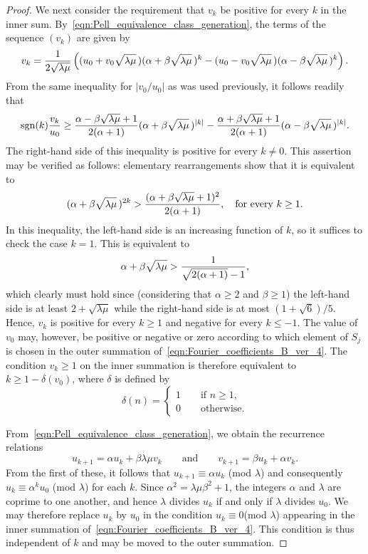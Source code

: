 \documentclass[11pt,reqno]{amsart}
\renewcommand{\=}{\;=\;}
\theoremstyle{myremark}
\newcommand{\sgn}{\operatorname{sgn}}
\begin{document}
\begin{proof}
We next consider the requirement that $v_k$ be positive for every $k$ in the inner sum. By~\eqref{eqn:Pell_equivalence_class_generation}, the terms of the sequence $(v_k)$ are given by 
\[ v_k = {1 \over 2\sqrt{\lambda\mu}} \left( (u_0 + v_0 \sqrt{\lambda\mu} \,)(\alpha + \beta \sqrt{\lambda\mu} \,)^k - (u_0 - v_0 \sqrt{\lambda\mu} \,)(\alpha - \beta \sqrt{\lambda\mu} \,)^k \right). \]
From the same inequality for $|v_0/u_0|$ as was used previously, it follows readily that
\[ 
\sgn(k) {v_k \over u_0} \geq {\alpha - \beta\sqrt{\lambda\mu} + 1 \over 2(\alpha+1)} (\alpha + \beta \sqrt{\lambda\mu} \,)^{|k|} - {\alpha + \beta\sqrt{\lambda\mu} + 1 \over 2(\alpha+1)} (\alpha - \beta \sqrt{\lambda\mu} \,)^{|k|}. 
\]
The right-hand side of this inequality is positive for every $k \neq 0$. This assertion may be verified as follows: elementary rearrangements show that it is equivalent to
\[ 
(\alpha+\beta\sqrt{\lambda\mu}\,)^{2k} > {(\alpha+\beta\sqrt{\lambda\mu}+1)^2 \over 2(\alpha+1)}, \quad \text{for every $k \geq 1$.} 
\]
In this inequality, the left-hand side is an increasing function of $k$, so it suffices to check the case $k=1$. 
This is equivalent to
\[ 
\alpha+\beta\sqrt{\lambda\mu} > {1 \over \sqrt{2(\alpha+1)}-1}, 
\]
which clearly must hold since (considering that $\alpha\geq2$ and $\beta\geq1$) the left-hand side is at least $2+\sqrt{\lambda\mu}$ while the right-hand side is at most $(1+\sqrt{6})/5$. 
Hence, $v_k$ is positive for every $k \geq 1$ and negative for every $k \leq -1$. The value of $v_0$ may, however, be positive or negative or zero according to which element of $S_j$ is chosen in the outer summation of~\eqref{eqn:Fourier_coefficients_B_ver_4}. 
The condition $v_k \geq 1$ on the inner summation is therefore equivalent to $k \geq 1-\delta(v_0)$, where $\delta$ is defined by
\[ 
\delta(n) = \begin{cases} 1 \qquad \text{if $n \geq 1$,} \\ 0 \qquad \text{otherwise.} \end{cases} 
\]

From~\eqref{eqn:Pell_equivalence_class_generation}, we obtain the recurrence relations
\begin{equation} \label{eqn:uv_recurrence}
u_{k+1} = \alpha u_k + \beta\lambda\mu v_k \qquad \text{and} \qquad v_{k+1} = \beta u_k + \alpha v_k.
\end{equation}
From the first of these, it follows that $u_{k+1} \equiv \alpha u_k$ (mod $\lambda$) and consequently $u_k \equiv \alpha^k u_0$ (mod $\lambda$) for each $k$. 
Since $\alpha^2 = \lambda\mu \beta^2 + 1$, the integers $\alpha$ and $\lambda$ are coprime to one another, and hence $\lambda$ divides $u_k$ if and only if $\lambda$ divides $u_0$. 
We may therefore replace $u_k$ by $u_0$ in the condition $u_k \equiv 0$(mod $\lambda$) appearing in the inner summation of~\eqref{eqn:Fourier_coefficients_B_ver_4}. 
This condition is thus independent of $k$ and may be moved to the outer summation.


\end{proof}
\end{document}
